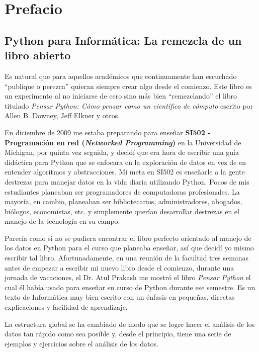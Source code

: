 
\chapter{Prefacio}

\section*{Python para Inform\'atica: La remezcla de un libro abierto}

Es natural que para aquellos acad\'emicos que continuamente han escuchado ``publique o perezca'' quieran siempre crear algo desde el comienzo. Este libro es  un 
experimento al no iniciarse de cero sino m\'as bien ``remezclando''
el libro titulado
\emph{Pensar Python: C\'omo pensar como un cient\'ifico de c\'omputo}
escrito por Allen B. Downey, Jeff Elkner y otros.

En diciembre de 2009 me estaba preparando para ense\~nar
{\bf SI502 - Programaci\'on en red (\textit{Networked Programming})} en la Universidad de Michigan,
por quinta vez seguida, y decid\'i que era hora de escribir una gu\'ia did\'actica para Python que se enfocara en la exploraci\'on de datos en vez de en entender algoritmos y abstracciones.
Mi meta en SI502 es ense\~narle a la gente destrezas para manejar datos en la vida diaria utilizando Python. Pocos de mis estudiantes planeaban ser programadores de computadoras profesionales. La mayor\'ia, en cambio, planeaban ser bibliotecarios, administradores, abogados, bi\'ologos, economistas, etc. y simplemente quer\'ian desarrollar destrezas en el manejo de la tecnolog\'ia en su campo.

Parec\'ia como si no se pudiera encontrar el libro perfecto orientado al manejo de los datos en Python para el curso que planeaba ense\~nar, as\'i que decid\'i yo mismo escribir tal libro. 
Afortunadamente, en una reuni\'on de la facultad tres semanas antes de empezar a escribir mi nuevo libro desde el comienzo, durante una jornada de vacaciones, el Dr. Atul Prakash me mostr\'o el libro \emph{Pensar Python} el cual \'el hab\'ia usado para ense\~nar su curso de Python durante ese semestre.  
Es un texto de Inform\'atica muy bien escrito con un \'enfasis en peque\~nas, directas explicaciones y facilidad de aprendizaje.  

La estructura global se ha cambiado de modo que se logre hacer el an\'alisis de los datos tan r\'apido como sea posible y, desde el principio, tiene una serie de ejemplos y ejercicios sobre el an\'alisis de los datos.


